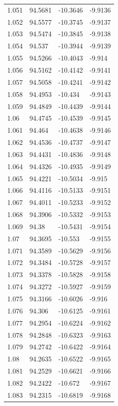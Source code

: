 \begin{tabular}{llll}
1.051 & 94.5681 & -10.3646 & -9.9136 \\
1.052 & 94.5577 & -10.3745 & -9.9137 \\
1.053 & 94.5474 & -10.3845 & -9.9138 \\
1.054 & 94.537 & -10.3944 & -9.9139 \\
1.055 & 94.5266 & -10.4043 & -9.914 \\
1.056 & 94.5162 & -10.4142 & -9.9141 \\
1.057 & 94.5058 & -10.4241 & -9.9142 \\
1.058 & 94.4953 & -10.434 & -9.9143 \\
1.059 & 94.4849 & -10.4439 & -9.9144 \\
1.06 & 94.4745 & -10.4539 & -9.9145 \\
1.061 & 94.464 & -10.4638 & -9.9146 \\
1.062 & 94.4536 & -10.4737 & -9.9147 \\
1.063 & 94.4431 & -10.4836 & -9.9148 \\
1.064 & 94.4326 & -10.4935 & -9.9149 \\
1.065 & 94.4221 & -10.5034 & -9.915 \\
1.066 & 94.4116 & -10.5133 & -9.9151 \\
1.067 & 94.4011 & -10.5233 & -9.9152 \\
1.068 & 94.3906 & -10.5332 & -9.9153 \\
1.069 & 94.38 & -10.5431 & -9.9154 \\
1.07 & 94.3695 & -10.553 & -9.9155 \\
1.071 & 94.3589 & -10.5629 & -9.9156 \\
1.072 & 94.3484 & -10.5728 & -9.9157 \\
1.073 & 94.3378 & -10.5828 & -9.9158 \\
1.074 & 94.3272 & -10.5927 & -9.9159 \\
1.075 & 94.3166 & -10.6026 & -9.916 \\
1.076 & 94.306 & -10.6125 & -9.9161 \\
1.077 & 94.2954 & -10.6224 & -9.9162 \\
1.078 & 94.2848 & -10.6323 & -9.9163 \\
1.079 & 94.2742 & -10.6422 & -9.9164 \\
1.08 & 94.2635 & -10.6522 & -9.9165 \\
1.081 & 94.2529 & -10.6621 & -9.9166 \\
1.082 & 94.2422 & -10.672 & -9.9167 \\
1.083 & 94.2315 & -10.6819 & -9.9168 \\

\end{tabular}
